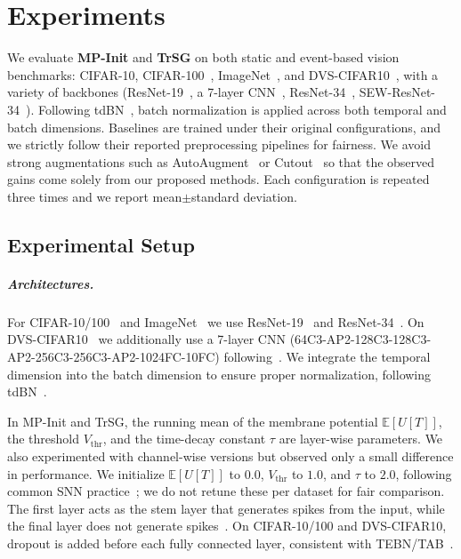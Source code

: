 \chapter{Experiments}
\label{ch:experiments}

We evaluate \textbf{MP-Init} and \textbf{TrSG} on both static and event-based vision benchmarks: CIFAR-10, CIFAR-100~\cite{cifar}, ImageNet~\cite{imagenet}, and DVS-CIFAR10~\cite{dvscifar10}, with a variety of backbones (ResNet-19~\cite{zheng:2021}, a 7-layer CNN~\cite{tebn:2022,tab:2024}, ResNet-34~\cite{resnet}, SEW-ResNet-34~\cite{fang:2021_2}). Following tdBN~\cite{zheng:2021}, batch normalization is applied across both temporal and batch dimensions. Baselines are trained under their original configurations, and we strictly follow their reported preprocessing pipelines for fairness. We avoid strong augmentations such as AutoAugment~\cite{autoaug} or Cutout~\cite{cutout} so that the observed gains come solely from our proposed methods. Each configuration is repeated three times and we report mean$\pm$standard deviation.

\section{Experimental Setup}
\label{sec:exp_setup}

\paragraph{Architectures.}
For CIFAR-10/100~\cite{cifar} and ImageNet~\cite{imagenet} we use ResNet-19~\cite{zheng:2021} and ResNet-34~\cite{resnet}. On DVS-CIFAR10~\cite{dvscifar10} we additionally use a 7-layer CNN (64C3-AP2-128C3-128C3-AP2-256C3-256C3-AP2-1024FC-10FC) following~\cite{tebn:2022, tab:2024}. We integrate the temporal dimension into the batch dimension to ensure proper normalization, following tdBN~\cite{zheng:2021}.

In MP-Init and TrSG, the running mean of the membrane potential $\mathbb{E}[U[T]]$, the threshold $V_{\text{thr}}$, and the time-decay constant $\tau$ are layer-wise parameters. We also experimented with channel-wise versions but observed only a small difference in performance. We initialize $\mathbb{E}[U[T]]$ to $0.0$, $V_{\text{thr}}$ to $1.0$, and $\tau$ to $2.0$, following common SNN practice~\cite{deng:2022,tebn:2022,fang:2021_2,fang:2021,meng:2023,shen:2024,zhou:2024_2,shi:2024}; we do not retune these per dataset for fair comparison. The first layer acts as the stem layer that generates spikes from the input, while the final layer does not generate spikes~\cite{deng:2022}. On CIFAR-10/100 and DVS-CIFAR10, dropout is added before each fully connected layer, consistent with TEBN/TAB~\cite{tebn:2022,tab:2024}.

